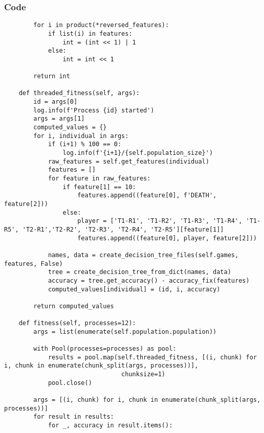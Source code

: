 \documentclass{beamer}
\begin{document}
\begin{frame}[fragile]
    \frametitle{Code}
    \fontsize{3pt}{5pt}\selectfont
    \begin{verbatim}
        for i in product(*reversed_features):
            if list(i) in features:
                int = (int << 1) | 1
            else:
                int = int << 1

        return int

    def threaded_fitness(self, args):
        id = args[0]
        log.info(f'Process {id} started')
        args = args[1]
        computed_values = {}
        for i, individual in args:
            if (i+1) % 100 == 0:
                log.info(f'{i+1}/{self.population_size}')
            raw_features = self.get_features(individual)
            features = []
            for feature in raw_features:
                if feature[1] == 10:
                    features.append((feature[0], f'DEATH', feature[2]))
                else:
                    player = ['T1-R1', 'T1-R2', 'T1-R3', 'T1-R4', 'T1-R5', 'T2-R1','T2-R2', 'T2-R3', 'T2-R4', 'T2-R5'][feature[1]]
                    features.append((feature[0], player, feature[2]))

            names, data = create_decision_tree_files(self.games, features, False)
            tree = create_decision_tree_from_dict(names, data)
            accuracy = tree.get_accuracy() - accuracy_fix(features)
            computed_values[individual] = (id, i, accuracy)

        return computed_values

    def fitness(self, processes=12):
        args = list(enumerate(self.population.population))

        with Pool(processes=processes) as pool:
            results = pool.map(self.threaded_fitness, [(i, chunk) for i, chunk in enumerate(chunk_split(args, processes))],
                                chunksize=1)
            pool.close()

        args = [(i, chunk) for i, chunk in enumerate(chunk_split(args, processes))]
        for result in results:
            for _, accuracy in result.items():
    \end{verbatim}
\end{frame}
\end{document}
